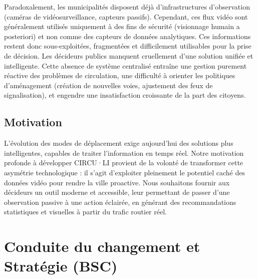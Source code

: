 Paradoxalement, les municipalités disposent déjà d'infrastructures d'observation (caméras de vidéosurveillance, capteurs passifs). Cependant, ces flux vidéo sont généralement utilisés uniquement à des fins de sécurité (visionnage humain a posteriori) et non comme des capteurs de données analytiques. Ces informations restent donc sous-exploitées, fragmentées et difficilement utilisables pour la prise de décision. Les décideurs publics manquent cruellement d'une solution unifiée et intelligente. Cette absence de système centralisé entraîne une gestion purement réactive des problèmes de circulation, une difficulté à orienter les politiques d'aménagement (création de nouvelles voies, ajustement des feux de signalisation), et engendre une insatisfaction croissante de la part des citoyens.

\subsection{Motivation}
L’évolution des modes de déplacement exige aujourd’hui des solutions plus intelligentes, capables de traiter l'information en temps réel. Notre motivation profonde à développer CIRCU·LI provient de la volonté de transformer cette asymétrie technologique : il s'agit d'exploiter pleinement le potentiel caché des données vidéo pour rendre la ville proactive. Nous souhaitons fournir aux décideurs un outil moderne et accessible, leur permettant de passer d'une observation passive à une action éclairée, en générant des recommandations statistiques et visuelles à partir du trafic routier réel.

\section{Conduite du changement et Stratégie (BSC)}

